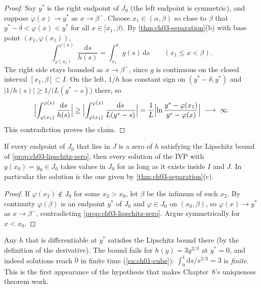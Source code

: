 \begin{proof}
Say $y^*$ is the right endpoint of $J_0$ (the left endpoint is symmetric), and
suppose $\varphi(x)\to y^*$ as $x\to\beta^-$. Choose $x_1\in(\alpha,\beta)$ so
close to $\beta$ that $y^*-\delta<\varphi(x)<y^*$ for all $x\in[x_1,\beta)$.
By \cref{thm:ch03-separation}(b) with base point $(x_1,\varphi(x_1))$,
\[
  \int_{\varphi(x_1)}^{\varphi(x)}\frac{\mathrm{d}s}{h(s)}
  = \int_{x_1}^{x}g(s)\,\mathrm{d}s\qquad (x_1\le x<\beta).
\]
The right side stays bounded as $x\to\beta^-$, since $g$ is continuous on the
closed interval $[x_1,\beta]\subset I$. On the left, $1/h$ has constant sign on
$(y^*-\delta,y^*)$ and $\bigl|1/h(s)\bigr|\ge 1/\bigl(L(y^*-s)\bigr)$ there, so
\[
  \Bigl|\int_{\varphi(x_1)}^{\varphi(x)}\frac{\mathrm{d}s}{h(s)}\Bigr|
  \ge \Bigl|\int_{\varphi(x_1)}^{\varphi(x)}\frac{\mathrm{d}s}{L(y^*-s)}\Bigr|
  = \frac1L\Bigl|\ln\frac{y^*-\varphi(x_1)}{y^*-\varphi(x)}\Bigr|
  \;\longrightarrow\;\infty .
\]
This contradiction proves the claim.
\end{proof}

\begin{corollary}\label{cor:ch03-trapped}
If every endpoint of $J_0$ that lies in $J$ is a zero of $h$ satisfying the
Lipschitz bound of \cref{prop:ch03-lipschitz-zero}, then every solution of the
IVP with $y(x_0) = y_0\in J_0$ takes values in $J_0$ for as long as it exists
inside $I$ and $J$. In particular the solution is the one given by
\cref{thm:ch03-separation}(c).
\end{corollary}
\begin{proof}
If $\varphi(x_2)\notin J_0$ for some $x_2>x_0$, let $\beta$ be the infimum of
such $x_2$. By continuity $\varphi(\beta)$ is an endpoint $y^*$ of $J_0$ and
$\varphi\in J_0$ on $(x_0,\beta)$, so $\varphi(x)\to y^*$ as $x\to\beta^-$,
contradicting \cref{prop:ch03-lipschitz-zero}. Argue symmetrically for
$x<x_0$.
\end{proof}

Any $h$ that is differentiable at $y^*$ satisfies the Lipschitz bound there
(by the definition of the derivative). The bound fails for $h(y) = 3y^{2/3}$
at $y^* = 0$, and indeed solutions reach $0$ in finite time
(\cref{ex:ch01-cube}): $\int_0^1 \mathrm{d}s/s^{2/3} = 3$ is \emph{finite}.
This is the first appearance of the hypothesis that makes Chapter~8's
uniqueness theorem work.

